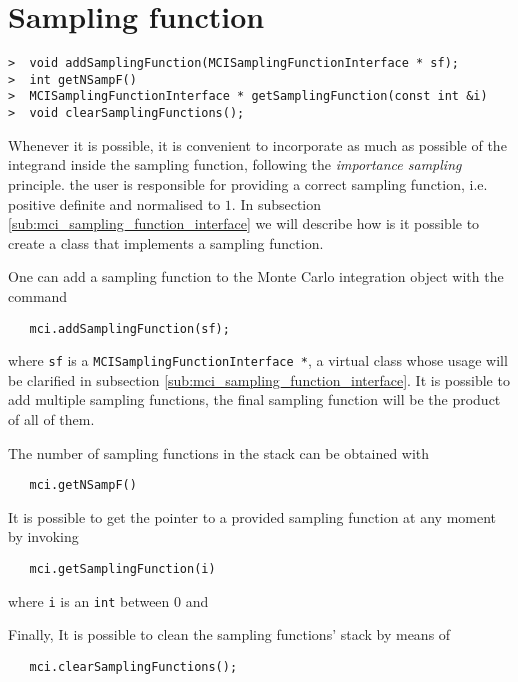 \documentclass[11pt,a4paper,twoside]{article}
\begin{document}



\section{Sampling function} %
\label{sec:sampling_function}

\begin{verbatim}
>  void addSamplingFunction(MCISamplingFunctionInterface * sf);
>  int getNSampF()
>  MCISamplingFunctionInterface * getSamplingFunction(const int &i)
>  void clearSamplingFunctions();  
\end{verbatim}

Whenever it is possible, it is convenient to incorporate as much as possible of the integrand inside the sampling function, following the \emph{importance sampling} principle.
the user is responsible for providing a correct sampling function, i.e. positive definite and normalised to $1$.
In subsection \ref{sub:mci_sampling_function_interface} we will describe how is it possible to create a class that implements a sampling function.

One can add a sampling function to the Monte Carlo integration object with the command
\begin{verbatim}
   mci.addSamplingFunction(sf);
\end{verbatim}
where \verb+sf+ is a \verb+MCISamplingFunctionInterface *+, a virtual class whose usage will be clarified in subsection \ref{sub:mci_sampling_function_interface}.
It is possible to add multiple sampling functions, the final sampling function will be the product of all of them.

The number of sampling functions in the stack can be obtained with
\begin{verbatim}
   mci.getNSampF()
\end{verbatim}

It is possible to get the pointer to a provided sampling function at any moment by invoking
\begin{verbatim}
   mci.getSamplingFunction(i)
\end{verbatim}
where \verb+i+ is an \verb+int+ between $0$ and 

Finally, It is possible to clean the sampling functions' stack by means of
\begin{verbatim}
   mci.clearSamplingFunctions();
\end{verbatim}
\end{document}
